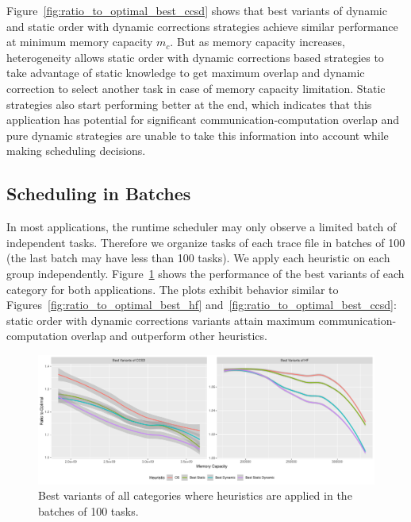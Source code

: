 \documentclass[sigconf]{acmart}
\begin{document}
{		Figure~\ref{fig:ratio_to_optimal_best_ccsd} shows that best variants of dynamic and static order with dynamic corrections strategies achieve similar performance at minimum memory capacity $m_c$. But as memory capacity increases, heterogeneity allows static order with dynamic corrections based strategies to take advantage of static knowledge to get maximum overlap and dynamic correction to select another task in case of memory capacity limitation. Static strategies also start performing better at the end, which indicates that this application has potential for significant communication-computation overlap and pure dynamic strategies are unable to take this information into account while making scheduling decisions.
		
		\subsection{Scheduling in Batches}
		In most applications, the runtime scheduler may only observe a limited batch of independent tasks. Therefore we organize tasks of each trace file in batches of 100 (the last batch may have less than 100 tasks). We apply each heuristic on each group independently. Figure~\ref{fig:best_variants_batch} shows the performance of the best variants of each category for both applications. The plots exhibit behavior similar to Figures~\ref{fig:ratio_to_optimal_best_hf} and~\ref{fig:ratio_to_optimal_best_ccsd}: static order with dynamic corrections variants attain maximum communication-computation overlap and outperform other heuristics.
		
		\begin{figure}[htb]
			\includegraphics[scale=0.5]{./results/plots/ratio_to_optimal_batch-best.pdf}
			\caption{Best variants of all categories where heuristics are applied in the batches of 100 tasks.}
			\label{fig:best_variants_batch}
		\end{figure}
		
}
\end{document}
